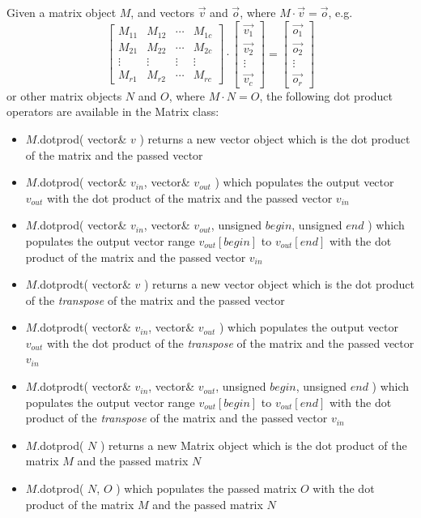 \documentclass{report}
\begin{document}
Given a matrix object $M$, and vectors $\vec{v}$ and $\vec{o}$, where
$ M \cdot \vec{v} = \vec{o} $, e.g.
\[
\left[ \begin{array}{cccc}
	M_{11} & M_{12} & \cdots & M_{1c} \\
	M_{21} & M_{22} & \cdots & M_{2c} \\
	\vdots & \vdots & \vdots & \vdots  \\

	M_{r1} & M_{r2} & \cdots & M_{rc}
\end{array} \right]
\cdot
\left[ \begin{array}{c}
	\vec{v_{1}} \\
	\vec{v_{2}} \\
	\vdots \\
	\vec{v_{c}}
\end{array} \right]
=
\left[ \begin{array}{c}
	\vec{o_{1}} \\
	\vec{o_{2}} \\
	\vdots \\
	\vec{o_{r}}
\end{array} \right]
\]
or other matrix objects $N$ and $O$, where $M \cdot N = O$,
the following dot product operators are available in the Matrix class:

\begin{itemize}
\item $M$.dotprod( vector\& $v$ ) returns a new vector object which is
      the dot product of the matrix and the passed vector
\item $M$.dotprod( vector\& $v_{in}$, vector\& $v_{out}$ ) which
      populates the output vector $v_{out}$ with the dot product of
      the matrix and the passed vector $v_{in}$
\item $M$.dotprod( vector\& $v_{in}$, vector\& $v_{out}$, unsigned
      $begin$, unsigned $end$ ) which populates the output vector
      range $v_{out}[begin]$ to $v_{out}[end]$ with the dot product of
      the matrix and the passed vector $v_{in}$
\item $M$.dotprodt( vector\& $v$ ) returns a new vector object which
      is the dot product of the {\em transpose} of the matrix and the
      passed vector
\item $M$.dotprodt( vector\& $v_{in}$, vector\& $v_{out}$ ) which
      populates the output vector $v_{out}$ with the dot product of
      the {\em transpose} of the matrix and the passed vector $v_{in}$
\item $M$.dotprodt( vector\& $v_{in}$, vector\& $v_{out}$, unsigned
      $begin$, unsigned $end$ ) which populates the output vector
      range $v_{out}[begin]$ to $v_{out}[end]$ with the dot product of
      the {\em transpose} of the matrix and the passed vector $v_{in}$
\item $M$.dotprod( $N$ ) returns a new Matrix object which is the dot
      product of the matrix $M$ and the passed matrix $N$
\item $M$.dotprod( $N$, $O$ ) which populates the passed matrix $O$
      with the dot product of the matrix $M$ and the passed matrix $N$

\end{itemize}
\end{document}

